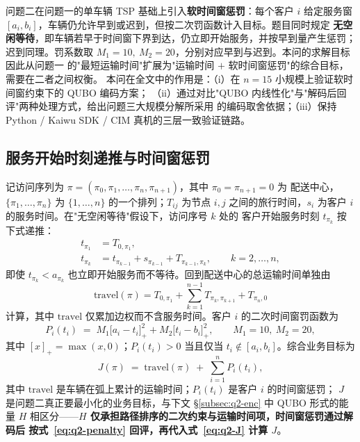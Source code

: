 \documentclass[UTF8,12pt,a4paper]{ctexart}
\begin{document}
问题二在问题一的单车辆 TSP 基础上引入\textbf{软时间窗惩罚}：每个客户 $i$ 给定服务窗
$[a_i,b_i]$，车辆仍允许早到或迟到，但按二次罚函数计入目标。题目同时规定
\textbf{无空闲等待}，即车辆若早于时间窗下界到达，仍立即开始服务，并按早到量产生惩罚；
迟到同理。罚系数取 $M_1=10,\ M_2=20$，分别对应早到与迟到。本问的求解目标因此从问题一
的"最短运输时间"扩展为"运输时间 $+$ 软时间窗惩罚"的综合目标，需要在二者之间权衡。
本问在全文中的作用是：（i）在 $n=15$ 小规模上验证软时间窗约束下的 QUBO 编码方案；
（ii）通过对比"QUBO 内线性化"与"解码后回评"两种处理方式，给出问题三大规模分解所采用
的编码取舍依据；（iii）保持 Python / Kaiwu SDK / CIM 真机的三层一致验证链路。

\subsection{服务开始时刻递推与时间窗惩罚}
\label{subsec:q2-time}

记访问序列为 $\pi=(\pi_0,\pi_1,\dots,\pi_n,\pi_{n+1})$，其中 $\pi_0=\pi_{n+1}=0$ 为
配送中心，$\{\pi_1,\dots,\pi_n\}$ 为 $\{1,\dots,n\}$ 的一个排列；$T_{ij}$ 为节点 $i,j$
之间的旅行时间，$s_i$ 为客户 $i$ 的服务时间。在"无空闲等待"假设下，访问序号 $k$ 处的
客户开始服务时刻 $t_{\pi_k}$ 按下式递推：
\begin{align}
t_{\pi_1} &= T_{0,\pi_1},
   \label{eq:q2-t-first}\\[2pt]
t_{\pi_k} &= t_{\pi_{k-1}} + s_{\pi_{k-1}} + T_{\pi_{k-1},\pi_k},\qquad k=2,\dots,n,
   \label{eq:q2-t-rec}
\end{align}
即使 $t_{\pi_k} < a_{\pi_k}$ 也立即开始服务而不等待。回到配送中心的总运输时间单独由
\begin{equation}
\label{eq:q2-travel}
\mathrm{travel}(\pi) = T_{0,\pi_1} + \sum_{k=1}^{n-1} T_{\pi_k,\pi_{k+1}} + T_{\pi_n,0}
\end{equation}
计算，其中 $\mathrm{travel}$ 仅累加边权而不含服务时间。客户 $i$ 的二次时间窗罚函数为
\begin{equation}
\label{eq:q2-penalty}
P_i(t_i) \;=\; M_1\bigl[a_i - t_i\bigr]_{+}^{2} + M_2\bigl[t_i - b_i\bigr]_{+}^{2},\qquad
M_1 = 10,\ M_2 = 20,
\end{equation}
其中 $[x]_{+}=\max(x,0)$；$P_i(t_i)>0$ 当且仅当 $t_i \notin [a_i,b_i]$。综合业务目标为
\begin{equation}
\label{eq:q2-J}
J(\pi) \;=\; \mathrm{travel}(\pi) \;+\; \sum_{i=1}^{n} P_i(t_i),
\end{equation}
其中 $\mathrm{travel}$ 是车辆在弧上累计的运输时间；$P_i(t_i)$ 是客户 $i$ 的时间窗惩罚；
$J$ 是问题二真正要最小化的业务目标，与下文 §\ref{subsec:q2-enc} 中 QUBO 形式的能量
$H$ 相区分——\textbf{$H$ 仅承担路径排序的二次约束与运输时间项，时间窗惩罚通过解码后
按式~\eqref{eq:q2-penalty} 回评，再代入式~\eqref{eq:q2-J} 计算 $J$}。
\end{document}
